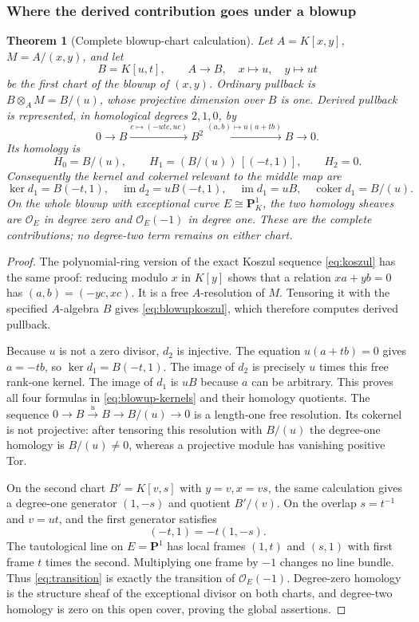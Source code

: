 \documentclass[11pt,a4paper]{article}
\newtheorem{theorem}{Theorem}[section]
\theoremstyle{definition}\newtheorem{definition}[theorem]{Definition}
\begin{document}
\subsubsection{Where the derived contribution goes under a blowup}

\begin{theorem}[Complete blowup-chart calculation]\label{thm:blowup}
Let $A=K[x,y]$, $M=A/(x,y)$, and let
\[
 B=K[u,t],\qquad A\longrightarrow B,\quad x\longmapsto u,
 \quad y\longmapsto ut
 \tag{AV7.4}\label{eq:blowupchart}
\]
be the first chart of the blowup of $(x,y)$. Ordinary pullback is
$B\otimes_A M=B/(u)$, whose projective dimension over $B$ is one.
Derived pullback is represented, in homological degrees $2,1,0$, by
\[
 0\longrightarrow B\xrightarrow{c\mapsto(-ut c,uc)}B^2
 \xrightarrow{(a,b)\mapsto u(a+tb)}B\longrightarrow0.
 \tag{AV7.5}\label{eq:blowupkoszul}
\]
Its homology is
\[
 H_0=B/(u),\qquad
 H_1=(B/(u))\,[(-t,1)],\qquad H_2=0.
 \tag{AV7.6}\label{eq:blowuphomology}
\]
Consequently the kernel and cokernel relevant to the middle map are
\[
 \ker d_1=B(-t,1),\quad \operatorname{im}d_2=uB(-t,1),\quad
 \operatorname{im}d_1=uB,\quad\operatorname{coker}d_1=B/(u).
 \tag{AV7.7}\label{eq:blowup-kernels}
\]
On the whole blowup with exceptional curve $E\cong\mathbf P^1_K$, the
two homology sheaves are $\mathcal O_E$ in degree zero and
$\mathcal O_E(-1)$ in degree one. These are the complete contributions;
no degree-two term remains on either chart.
\end{theorem}
\begin{proof}
The polynomial-ring version of the exact Koszul sequence
\eqref{eq:koszul} has the same proof: reducing modulo $x$ in $K[y]$
shows that a relation $xa+yb=0$ has $(a,b)=(-yc,xc)$. It is a free
$A$-resolution of $M$. Tensoring it with the specified $A$-algebra $B$
gives \eqref{eq:blowupkoszul}, which therefore computes derived pullback.

Because $u$ is not a zero divisor, $d_2$ is injective. The equation
$u(a+tb)=0$ gives $a=-tb$, so $\ker d_1=B(-t,1)$. The image of $d_2$
is precisely $u$ times this free rank-one kernel. The image of $d_1$
is $uB$ because $a$ can be arbitrary. This proves all four formulas
in \eqref{eq:blowup-kernels} and their homology quotients.
The sequence $0\to B\xrightarrow{u}B\to B/(u)\to0$ is a length-one
free resolution. Its cokernel is not projective: after tensoring this
resolution with $B/(u)$ the degree-one homology is $B/(u)\ne0$,
whereas a projective module has vanishing positive Tor.

On the second chart $B'=K[v,s]$ with $y=v,x=vs$, the same calculation
gives a degree-one generator $(1,-s)$ and quotient $B'/(v)$.
On the overlap $s=t^{-1}$ and $v=ut$, and the first generator satisfies
\[
 (-t,1)=-t(1,-s).
 \tag{AV7.8}\label{eq:transition}
\]
The tautological line on $E=\mathbf P^1$ has local frames $(1,t)$ and
$(s,1)$ with first frame $t$ times the second. Multiplying one frame
by $-1$ changes no line bundle. Thus \eqref{eq:transition} is exactly
the transition of $\mathcal O_E(-1)$. Degree-zero homology is the
structure sheaf of the exceptional divisor on both charts, and
degree-two homology is zero on this open cover, proving the global
assertions.
\end{proof}
\end{document}
